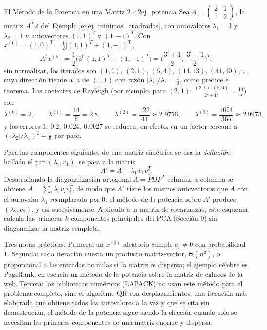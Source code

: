 \documentclass[11pt, a4paper]{article}
\begin{document}
\begin{ejemplo}{El Método de la Potencia en una Matriz $2 \times 2$}{ej_potencia}
Sea $A = \begin{pmatrix} 2 & 1 \\ 1 & 2 \end{pmatrix}$, la matriz $A^T A$ del Ejemplo \ref{ej:ej_minimos_cuadrados}, con autovalores $\lambda_1 = 3$ y $\lambda_2 = 1$ y autovectores $(1, 1)^T$ y $(1, -1)^T$. Con $x^{(0)} = (1, 0)^T = \frac{1}{2} \big[ (1,1)^T + (1,-1)^T \big]$,
\[
A^t x^{(0)} = \frac{1}{2} \Big( 3^t \, (1, 1)^T + (1, -1)^T \Big) = \Big( \frac{3^t + 1}{2}, \ \frac{3^t - 1}{2} \Big)^{T}:
\]
sin normalizar, los iterados son $(1,0)$, $(2,1)$, $(5,4)$, $(14,13)$, $(41,40)$, \dots, cuya dirección tiende a la de $(1,1)$ con razón $|\lambda_2| / \lambda_1 = \frac{1}{3}$, como predice el teorema. Los cocientes de Rayleigh (por ejemplo, para $(2,1)$: $\frac{(2,1) \cdot (5,4)}{2^2 + 1^2} = \frac{14}{5}$) son
\[
\lambda^{(0)} = 2, \qquad \lambda^{(1)} = \frac{14}{5} = 2.8, \qquad \lambda^{(2)} = \frac{122}{41} \approx 2.9756, \qquad \lambda^{(3)} = \frac{1094}{365} \approx 2.9973,
\]
y los errores $1, \ 0.2, \ 0.024, \ 0.0027$ se reducen, en efecto, en un factor cercano a $(|\lambda_2| / \lambda_1)^2 = \frac{1}{9}$ por paso.
\end{ejemplo}

\obs Para las componentes siguientes de una matriz simétrica se usa la \emph{deflación}: hallado el par $(\lambda_1, v_1)$, se pasa a la matriz
\[
A' = A - \lambda_1 \, v_1 v_1^T.
\]
Desarrollando la diagonalización ortogonal $A = P D P^T$ columna a columna se obtiene $A = \sum_i \lambda_i \, v_i v_i^T$, de modo que $A'$ tiene los mismos autovectores que $A$ con el autovalor $\lambda_1$ reemplazado por $0$: el método de la potencia sobre $A'$ produce $(\lambda_2, v_2)$, y así sucesivamente. Aplicado a la matriz de covarianzas, este esquema calcula las primeras $k$ componentes principales del PCA (Sección 9) sin diagonalizar la matriz completa.

\obs Tres notas prácticas. Primera: un $x^{(0)}$ aleatorio cumple $c_1 \neq 0$ con probabilidad $1$. Segunda: cada iteración cuesta un producto matriz-vector, $\Theta(n^2)$, o proporcional a las entradas no nulas si la matriz es dispersa; el ejemplo célebre es PageRank, en esencia un método de la potencia sobre la matriz de enlaces de la web. Tercera: las bibliotecas numéricas (LAPACK) no usan este método para el problema completo, sino el algoritmo QR con desplazamientos, una iteración más elaborada que obtiene todos los autovalores a la vez y que se cita sin demostración; el método de la potencia sigue siendo la elección cuando solo se necesitan las primeras componentes de una matriz enorme y dispersa.
\end{document}
